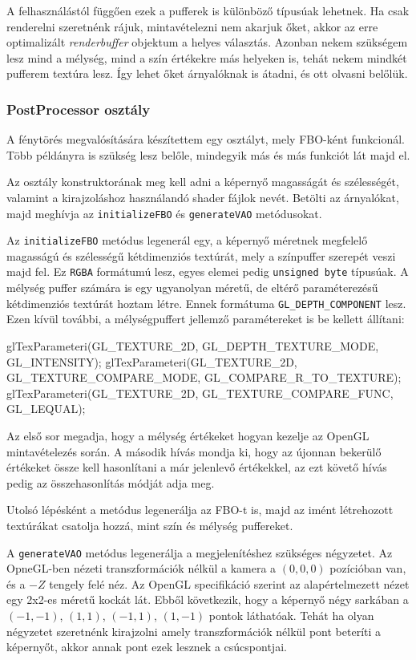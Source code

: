 A felhasználástól függően ezek a pufferek is különböző típusúak lehetnek. Ha csak renderelni szeretnénk rájuk, mintavételezni nem akarjuk őket, akkor az erre optimalizált \textit{renderbuffer} objektum a helyes választás. Azonban nekem szükségem lesz mind a mélység, mind a szín értékekre más helyeken is, tehát nekem mindkét pufferem textúra lesz. Így lehet őket árnyalóknak is átadni, és ott olvasni belőlük. 

\subsubsection{PostProcessor osztály}
A fénytörés megvalósítására készítettem egy osztályt, mely FBO-ként funkcionál. Több példányra is szükség lesz belőle, mindegyik más és más funkciót lát majd el.

Az osztály konstruktorának meg kell adni a képernyő magasságát és szélességét, valamint a kirajzoláshoz használandó shader fájlok nevét. Betölti az árnyalókat, majd meghívja az \texttt{initializeFBO} és \texttt{generateVAO} metódusokat.

Az \texttt{initializeFBO} metódus legenerál egy, a képernyő méretnek megfelelő magasságú és szélességű kétdimenziós textúrát, mely a színpuffer szerepét veszi majd fel. Ez \texttt{RGBA} formátumú lesz, egyes elemei pedig \texttt{unsigned byte} típusúak. A mélység puffer számára is egy ugyanolyan méretű, de eltérő paraméterezésű kétdimenziós textúrát hoztam létre. Ennek formátuma \texttt{GL\_DEPTH\_COMPONENT} lesz. Ezen kívül további, a mélységpuffert jellemző paramétereket is be kellett állítani:
\begin{cpp}
glTexParameteri(GL_TEXTURE_2D, GL_DEPTH_TEXTURE_MODE, GL_INTENSITY);
glTexParameteri(GL_TEXTURE_2D, GL_TEXTURE_COMPARE_MODE, 
						GL_COMPARE_R_TO_TEXTURE);
glTexParameteri(GL_TEXTURE_2D, GL_TEXTURE_COMPARE_FUNC, GL_LEQUAL);
\end{cpp}
Az első sor megadja, hogy a mélység értékeket hogyan kezelje az OpenGL mintavételezés során. A második hívás mondja ki, hogy az újonnan bekerülő értékeket össze kell hasonlítani a már jelenlevő értékekkel, az ezt követő hívás pedig az összehasonlítás módját adja meg.

Utolsó lépésként a metódus legenerálja az FBO-t is, majd az imént létrehozott textúrákat csatolja hozzá, mint szín és mélység puffereket.

A \texttt{generateVAO} metódus legenerálja a megjelenítéshez szükséges négyzetet. Az OpneGL-ben nézeti transzformációk nélkül a kamera a $(0, 0, 0)$ pozícióban van, és a $-Z$ tengely felé néz. Az OpenGL specifikáció szerint az alapértelmezett nézet egy 2x2-es méretű kockát lát. Ebből következik, hogy a képernyő négy sarkában a $(-1, -1)$, $(1, 1)$, $(-1, 1)$, $(1, -1)$ pontok láthatóak. Tehát ha olyan négyzetet szeretnénk kirajzolni amely transzformációk nélkül pont beteríti a képernyőt, akkor annak pont ezek lesznek a csúcspontjai.

